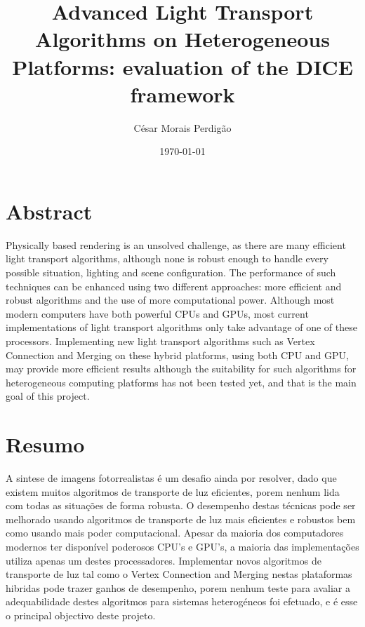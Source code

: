 \documentclass[
  oneside,
  11pt, a4paper,
  footinclude=true,
  headinclude=true,
  cleardoublepage=empty
]{scrbook}
\title{Advanced Light Transport Algorithms on Heterogeneous Platforms: evaluation of the DICE framework}
\author{César Morais Perdigão}
\date{\today}
\begin{document}
	

    
\sf
	\thispagestyle{empty}
	
\rm
	\cleardoublepage


	\cleardoublepage
	
\chapter*{Abstract}
Physically based rendering is an unsolved challenge, as there are many efficient light transport algorithms, although none is robust enough to handle every possible situation, lighting and scene configuration. The performance of such techniques can be enhanced using two different approaches: more efficient and robust algorithms and the use of more computational power. Although most modern computers have both powerful CPUs and GPUs, most current implementations of light transport algorithms only take advantage of one of these processors. Implementing new light transport algorithms such as Vertex Connection and Merging on these hybrid platforms, using both CPU and GPU, may provide more efficient results although the suitability for such algorithms for heterogeneous computing platforms has not been tested yet, and that is the main goal of this project.

	\cleardoublepage

\chapter*{Resumo}
A sintese de imagens fotorrealistas é um desafio ainda por resolver, dado que existem muitos algoritmos de transporte de luz eficientes, porem nenhum lida com todas as situações de forma robusta. O desempenho destas técnicas pode ser melhorado usando algoritmos de transporte de luz mais eficientes e robustos bem como usando mais poder computacional. Apesar da maioria dos computadores modernos ter disponível poderosos CPU's e GPU's, a maioria das implementações utiliza apenas um destes processadores. Implementar novos algoritmos de transporte de luz tal como o Vertex Connection and Merging nestas plataformas hibridas pode trazer ganhos de desempenho, porem nenhum teste para avaliar a adequabilidade destes algoritmos para sistemas heterogéneos foi efetuado, e é esse o principal objectivo deste projeto.
\end{document}
